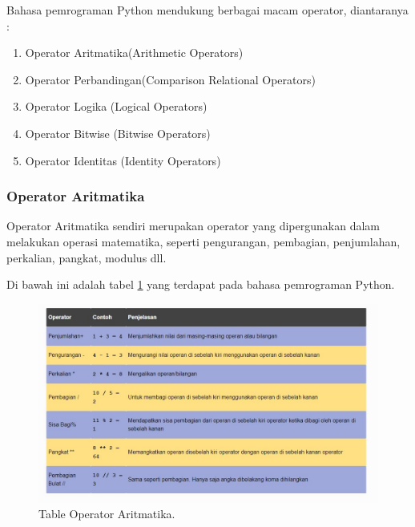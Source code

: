 Bahasa pemrograman Python mendukung berbagai macam operator, diantaranya :
\begin{enumerate}
	\item Operator Aritmatika(Arithmetic Operators)
	\item Operator Perbandingan(Comparison Relational Operators)
	\item Operator Logika (Logical Operators)
	\item Operator Bitwise (Bitwise Operators)
	\item Operator Identitas (Identity Operators)
\end{enumerate}  

\subsubsection{Operator Aritmatika}
Operator Aritmatika sendiri merupakan operator yang dipergunakan dalam melakukan operasi matematika, seperti pengurangan, pembagian, penjumlahan, perkalian, pangkat, modulus dll.

Di bawah ini adalah tabel \ref{tablearitmatika} yang terdapat pada bahasa pemrograman Python.
\begin{figure}[ht]
	\centerline{\includegraphics[width=1\textwidth]{Plagiarisme/tablearitmatika.JPG}}
	\caption{Table Operator Aritmatika.}
	\label{tablearitmatika}
\end{figure}

